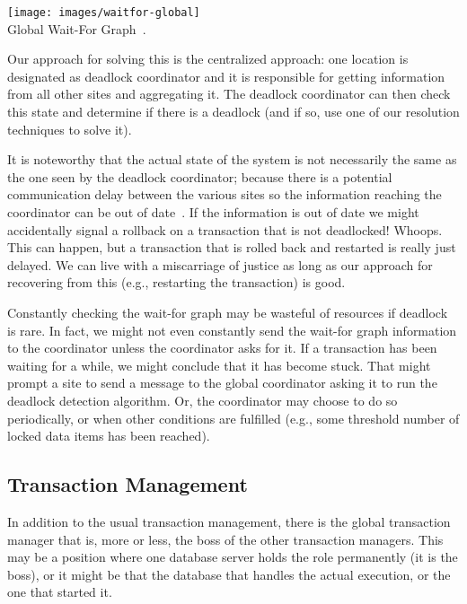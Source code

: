 \documentclass[a4paper]{report}
\begin{document}
\begin{center}
\texttt{[image: images/waitfor-global]}\\
Global Wait-For Graph~\cite{dsc}.
\end{center}

Our approach for solving this is the centralized approach: one location is designated as deadlock coordinator and it is responsible for getting information from all other sites and aggregating it. The deadlock coordinator can then check this state and determine if there is a deadlock (and if so, use one of our resolution techniques to solve it).

It is noteworthy that the actual state of the system is not necessarily the same as the one seen by the deadlock coordinator; because there is a potential communication delay between the various sites so the information reaching the coordinator can be out of date~\cite{dsc}. If the information is out of date we might accidentally signal a rollback on a transaction that is not deadlocked! Whoops. This can happen, but a transaction that is rolled back and restarted is really just delayed. We can live with a miscarriage of justice as long as our approach for recovering from this (e.g., restarting the transaction) is good.

Constantly checking the wait-for graph may be wasteful of resources if deadlock is rare. In fact, we might not even constantly send the wait-for graph information to the coordinator unless the coordinator asks for it. If a transaction has been waiting for a while, we might conclude that it has become stuck. That might prompt a site to send a message to the global coordinator asking it to run the deadlock detection algorithm. Or, the coordinator may choose to do so periodically, or when other conditions are fulfilled (e.g., some threshold number of locked data items has been reached). 

\subsection*{Transaction Management}

In addition to the usual transaction management, there is the global transaction manager that is, more or less, the boss of the other transaction managers. This may be a position where one database server holds the role permanently (it is the boss), or it might be that the database that handles the actual execution, or the one that started it.
\end{document}
